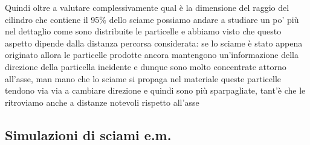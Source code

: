 Quindi oltre a valutare complessivamente qual è la dimensione del raggio del cilindro che contiene il 95\% dello sciame possiamo andare a studiare un po' più nel dettaglio come sono distribuite le particelle e abbiamo visto che questo aspetto dipende dalla distanza percorsa considerata: se lo sciame è stato appena originato allora le particelle prodotte ancora mantengono un'informazione della direzione della particella incidente e dunque sono molto concentrate attorno all'asse, man mano che lo sciame si propaga nel materiale queste particelle tendono via via a cambiare direzione e quindi sono più sparpagliate, tant'è che le ritroviamo anche a distanze notevoli rispetto all'asse

\subsection{Simulazioni di sciami e.m.}


